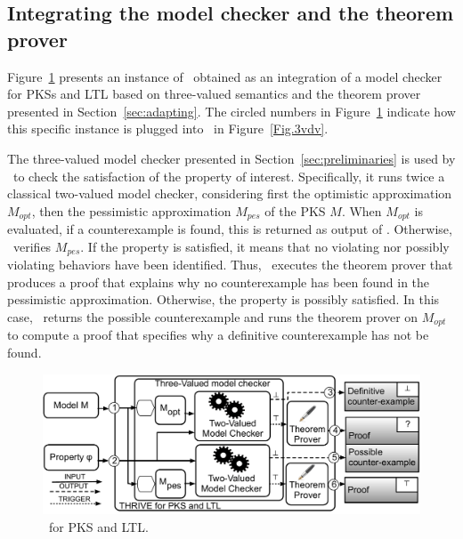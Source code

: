 \subsection{Integrating the model checker and the theorem prover}
\label{sub:integrating}
Figure~\ref{Fig.3vdvinstance} presents an instance of \NAME\ obtained as an integration of a model checker for PKSs and LTL based on three-valued semantics and the theorem prover presented in Section~\ref{sec:adapting}. The circled numbers in Figure~\ref{Fig.3vdvinstance} indicate how this specific instance is plugged into \NAME\ in Figure~\ref{Fig.3vdv}.






The three-valued model checker presented in Section~\ref{sec:preliminaries} is used by \NAME\  to check the satisfaction of the property of interest.
Specifically, it runs twice a classical two-valued model checker, considering first the optimistic approximation $M_{opt}$, then the pessimistic approximation $M_{pes}$ of the PKS $M$.
When $M_{opt}$ is evaluated, if a counterexample is found, this is returned as output of \NAME .
Otherwise, \NAME\ verifies $M_{pes}$. 
If the property is satisfied, it means that no violating nor possibly violating behaviors have been identified.
Thus, \NAME\ executes the theorem prover that produces a proof that explains why no counterexample has been found in the pessimistic approximation.
Otherwise, the property is possibly satisfied.
In this case, \NAME\ returns the possible counterexample and runs the theorem prover on $M_{opt}$ to compute a proof that specifies why a definitive counterexample has not be found.




\begin{figure}[t]
\begin{center}         
\includegraphics[width=\linewidth]{./images/atvaFigPKS.pdf}
\end{center}
\caption{\NAME\ for PKS and LTL.}  
\label{Fig.3vdvinstance}
\end{figure}



